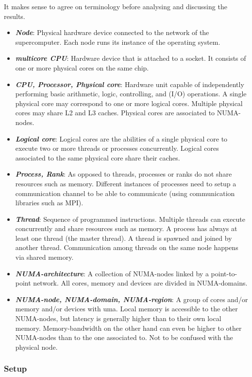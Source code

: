 \documentclass{article}
\theoremstyle{plain} %
\theoremstyle{convention} %
\theoremstyle{remark} %
\def\df#1{\textbf{\textit{#1}}}
\numberwithin{equation}{section}
\begin{document}
It makes sense to agree on terminology before analysing and discussing the results.

\begin{itemize}
    \item \df{Node}: Physical hardware device connected to the network of the supercomputer. Each node runs its instance of the operating system.
    \item \df{multicore CPU}: Hardware device that is attached to a socket. It consists of one or more physical cores on the same chip.
    \item \df{CPU, Processor, Physical core}: Hardware unit capable of independently performing basic arithmetic, logic, controlling, and (I/O) operations. A single physical core may correspond to one or more logical cores. Multiple physical cores may share L2 and L3 caches. Physical cores are associated to NUMA-nodes.
    \item \df{Logical core}: Logical cores are the abilities of a single physical core to execute two or more threads or processes concurrently. Logical cores associated to the same physical core share their caches.
    \item \df{Process, Rank}: As opposed to threads, processes or ranks do not share resources such as memory. Different instances of processes need to setup a communication channel to be able to communicate (using communication libraries such as MPI). 
    \item \df{Thread}: Sequence of programmed instructions. Multiple threads can execute concurrently and share resources such as memory. A process has always at least one thread (the master thread). A thread is spawned and joined by another thread. Communication among threads on the same node happens via shared memory.
    \item \df{NUMA-architecture}: A collection of NUMA-nodes linked by a point-to-point network. All cores, memory and devices are divided in NUMA-domains.
    \item \df{NUMA-node, NUMA-domain, NUMA-region}: A group of cores and/or memory and/or devices with \acrfull{uma}. Local memory is accessible to the other NUMA-nodes, but latency is generally higher than to their own local memory. Memory-bandwidth on the other hand can even be higher to other NUMA-nodes than to the one associated to. Not to be confused with the physical node.
\end{itemize}

\subsubsection{Setup}
\end{document}
